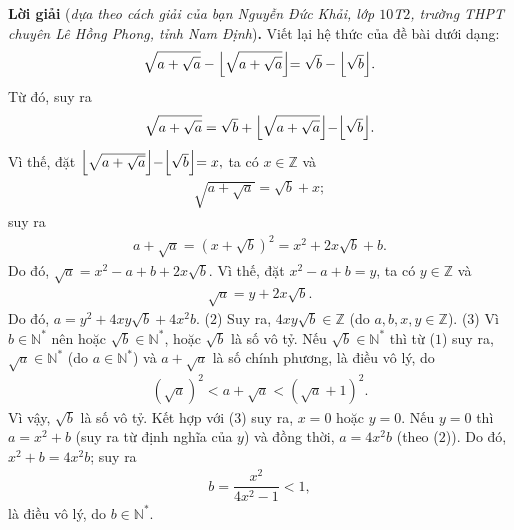 \begin{multicols}{2}
	\vskip 0.05cm
	\textbf{\color{thachthuctoanhoc}Lời giải} (\textit{dựa theo cách giải của bạn Nguyễn Đức Khải, lớp $10$T$2$, trường THPT chuyên Lê Hồng Phong, tỉnh Nam Định})\textbf{\color{thachthuctoanhoc}.}
	\vskip 0.05cm
	Viết lại hệ thức của đề bài dưới dạng:
	\begin{align*}
		\sqrt {a + \sqrt a }  - \Bigl\lfloor {\sqrt {a + \sqrt a } } \Bigl\rfloor = \sqrt b  - \Bigl\lfloor {\sqrt b } \Bigl\rfloor.
	\end{align*}
	Từ đó, suy ra
	\begin{align*}
		\sqrt {a + \sqrt a }  = \sqrt b  + \Bigl\lfloor {\sqrt {a + \sqrt a } } \Bigl\rfloor - \Bigl\lfloor {\sqrt b } \Bigl\rfloor.
	\end{align*}
	Vì thế, đặt $\Bigl\lfloor {\sqrt {a + \sqrt a } }\Bigl\rfloor - \Bigl\lfloor {\sqrt b } \Bigl\rfloor = x,$  ta có $x \in \mathbb{Z}$ và
	\begin{align*}
		\sqrt {a + \sqrt a }  = \sqrt b  + x;
	\end{align*}
	suy ra
	\begin{align*}
		a \!+\! \sqrt a  \!=\! {\left( {x \!+\! \sqrt b } \right)^2} \!=\! {x^2} \!+\! 2x\sqrt b  \!+\! b. \tag{$1$}
	\end{align*}
	Do đó, $\sqrt a  = {x^2} - a + b + 2x\sqrt b.$
	\vskip 0.05cm
	Vì thế, đặt ${x^2} - a + b = y$,  ta có  $y \in \mathbb{Z}$ và
	\begin{align*}
		\sqrt a  = y + 2x\sqrt b .
	\end{align*}
	Do đó, $a = {y^2} + 4xy\sqrt b  + 4{x^2}b$. \hfill ($2$)
	\vskip 0.05cm
	Suy ra, $4xy\sqrt{b} \in \mathbb{Z}$ (do $a, b, x, y \in \mathbb{Z}$). \hfill ($3$)
	\vskip 0.05cm
	Vì $b \in \mathbb{N^*}$  nên hoặc $\sqrt{b} \in \mathbb{N^*}$,  hoặc $\sqrt{b}$  là số vô tỷ.
	\vskip 0.05cm
	Nếu $\sqrt{b} \in \mathbb{N^*}$ thì từ ($1$) suy ra, $\sqrt{a} \in \mathbb{N^*}$  (do  $a \in \mathbb{N^*}$) và $a + \sqrt{a}$  là số chính phương, là điều vô lý, do
	\begin{align*}
		{\left( {\sqrt a } \right)^2} < a + \sqrt a  < {\left( {\sqrt a  + 1} \right)^2}.
	\end{align*}
	Vì vậy, $\sqrt{b}$  là số vô tỷ. Kết hợp với ($3$) suy ra, $x = 0$ hoặc $y = 0$.
	\vskip 0.05cm
	Nếu $y = 0$ thì $a = x^2 + b$  (suy ra từ định nghĩa của $y$) và đồng thời, $a = 4x^2b$  (theo ($2$)). Do đó,
	${x^2} + b = 4{x^2}b$;
	suy ra
	\begin{align*}
		b = \dfrac{{{x^2}}}{{4{x^2} - 1}} < 1,
	\end{align*}
	là điều vô lý, do $b \in \mathbb{N^*}$.

\end{multicols}
